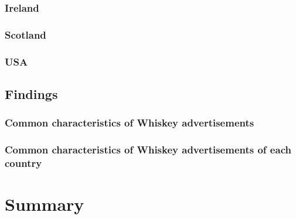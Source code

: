 \documentclass{beamer}
\begin{document}
\begin{frame}
 \frametitle{Ireland}
\end{frame}

\begin{frame}
 \frametitle{Scotland}
\end{frame}

\begin{frame}
 \frametitle{USA}
\end{frame}

\subsection{Findings}

\begin{frame}
 \frametitle{Common characteristics of Whiskey advertisements}
\end{frame}

\begin{frame}
 \frametitle{Common characteristics of Whiskey advertisements of each
country}
\end{frame}

\section{Summary}

\begin{frame}
 \frametitle{}
\end{frame}

\end{document}
